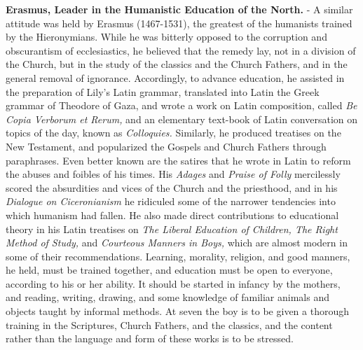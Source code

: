 \documentclass[
]{book}
\begin{document}
\textbf{Erasmus, Leader in the Humanistic Education of the North.} - A similar attitude was held by Erasmus (1467-1531), the greatest of the humanists trained by the Hieronymians. While he was bitterly opposed to the corruption and obscurantism of ecclesiastics, he believed that the remedy lay, not in a division of the Church, but in the study of the classics and the Church Fathers, and in the general removal of ignorance. Accordingly, to advance education, he assisted in the preparation of Lily's Latin grammar, translated into Latin the Greek grammar of Theodore of Gaza, and wrote a work on Latin composition, called \emph{Be Copia Verborum et Rerum,} and an elementary text-book of Latin conversation on topics of the day, known as \emph{Colloquies.} Similarly, he produced treatises on the New Testament, and popularized the Gospels and Church Fathers through paraphrases. Even better known are the satires that he wrote in Latin to reform the abuses and foibles of his times. His \emph{Adages} and \emph{Praise of Folly} mercilessly scored the absurdities and vices of the Church and the priesthood, and in his \emph{Dialogue on Ciceronianism} he ridiculed some of the narrower tendencies into which humanism had fallen. He also made direct contributions to educational theory in his Latin treatises on \emph{The Liberal Education of Children, The Right Method of Study,} and \emph{Courteous Manners in Boys,} which are almost modern in some of their recommendations. Learning, morality, religion, and good manners, he held, must be trained together, and education must be open to everyone, according to his or her ability. It should be started in infancy by the mothers, and reading, writing, drawing, and some knowledge of familiar animals and objects taught by informal methods. At seven the boy is to be given a thorough training in the Scriptures, Church Fathers, and the classics, and the content rather than the language and form of these works is to be stressed.
\end{document}
